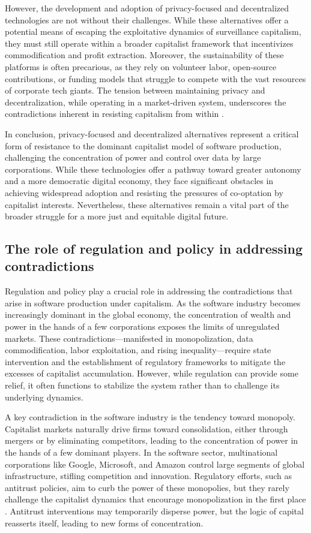 \begin{refsection}
However, the development and adoption of privacy-focused and decentralized technologies are not without their challenges. While these alternatives offer a potential means of escaping the exploitative dynamics of surveillance capitalism, they must still operate within a broader capitalist framework that incentivizes commodification and profit extraction. Moreover, the sustainability of these platforms is often precarious, as they rely on volunteer labor, open-source contributions, or funding models that struggle to compete with the vast resources of corporate tech giants. The tension between maintaining privacy and decentralization, while operating in a market-driven system, underscores the contradictions inherent in resisting capitalism from within \cite[pp.~87-89]{morozov2013}.

In conclusion, privacy-focused and decentralized alternatives represent a critical form of resistance to the dominant capitalist model of software production, challenging the concentration of power and control over data by large corporations. While these technologies offer a pathway toward greater autonomy and a more democratic digital economy, they face significant obstacles in achieving widespread adoption and resisting the pressures of co-optation by capitalist interests. Nevertheless, these alternatives remain a vital part of the broader struggle for a more just and equitable digital future.

\subsection{The role of regulation and policy in addressing contradictions}

Regulation and policy play a crucial role in addressing the contradictions that arise in software production under capitalism. As the software industry becomes increasingly dominant in the global economy, the concentration of wealth and power in the hands of a few corporations exposes the limits of unregulated markets. These contradictions—manifested in monopolization, data commodification, labor exploitation, and rising inequality—require state intervention and the establishment of regulatory frameworks to mitigate the excesses of capitalist accumulation. However, while regulation can provide some relief, it often functions to stabilize the system rather than to challenge its underlying dynamics.

A key contradiction in the software industry is the tendency toward monopoly. Capitalist markets naturally drive firms toward consolidation, either through mergers or by eliminating competitors, leading to the concentration of power in the hands of a few dominant players. In the software sector, multinational corporations like Google, Microsoft, and Amazon control large segments of global infrastructure, stifling competition and innovation. Regulatory efforts, such as antitrust policies, aim to curb the power of these monopolies, but they rarely challenge the capitalist dynamics that encourage monopolization in the first place \cite[pp.~83-85]{fuchs2015}. Antitrust interventions may temporarily disperse power, but the logic of capital reasserts itself, leading to new forms of concentration.


\end{refsection}

